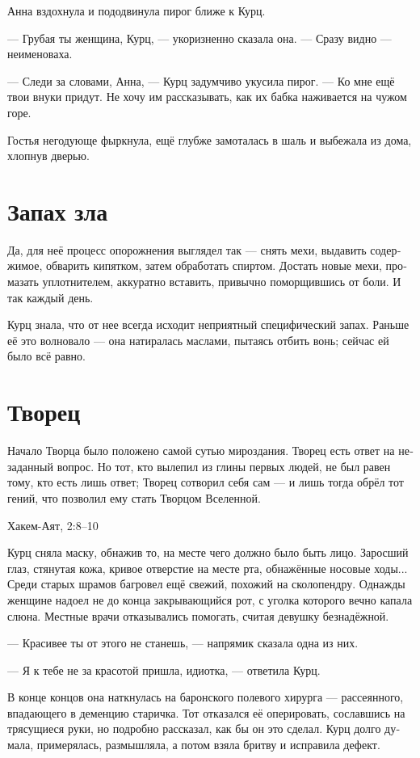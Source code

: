\documentclass[a4paper,12pt,fleqn]{book}\usepackage{cooltooltips}\usepackage{polyglossia}\setdefaultlanguage[babelshorthands=true]{russian}\setotherlanguage{english}\defaultfontfeatures{Ligatures=TeX,Mapping=tex-text} \usepackage{xcolor}\definecolor{lightgray}{HTML}{bbbbbb}\color{lightgray}\newcommand{\ml}[3]{\textenglish{\textcolor{black}{#3}}}
\begin{document}
Анна вздохнула и пододвинула пирог ближе к Курц.

--- Грубая ты женщина, Курц, --- укоризненно сказала она.
--- Сразу видно --- неименоваха.

--- Следи за словами, Анна, --- Курц задумчиво укусила пирог.
--- Ко мне ещё твои внуки придут.
Не хочу им рассказывать, как их бабка наживается на чужом горе.

Гостья негодующе фыркнула, ещё глубже замоталась в шаль и выбежала из дома, хлопнув дверью.

\section{Запах зла}

Да, для неё процесс опорожнения выглядел так --- снять мехи, выдавить содержимое, обварить кипятком, затем обработать спиртом.
Достать новые мехи, промазать уплотнителем, аккуратно вставить, привычно поморщившись от боли.
И так каждый день.

Курц знала, что от нее всегда исходит неприятный специфический запах.
Раньше её это волновало --- она натиралась маслами, пытаясь отбить вонь;
сейчас ей было всё равно.

\section{Творец}

\epigraph{Начало Творца было положено самой сутью мироздания.
Творец есть ответ на незаданный вопрос.
Но тот, кто вылепил из глины первых людей, не был равен тому, кто есть лишь ответ;
Творец сотворил себя сам --- и лишь тогда обрёл тот гений, что позволил ему стать Творцом Вселенной.}
{Хакем-Аят, 2:8--10}

Курц сняла маску, обнажив то, на месте чего должно было быть лицо.
Заросший глаз, стянутая кожа, кривое отверстие на месте рта, обнажённые носовые ходы...
Среди старых шрамов багровел ещё свежий, похожий на сколопендру.
Однажды женщине надоел не до конца закрывающийся рот, с уголка которого вечно капала слюна.
Местные врачи отказывались помогать, считая девушку безнадёжной.

--- Красивее ты от этого не станешь, --- напрямик сказала одна из них.

--- Я к тебе не за красотой пришла, идиотка, --- ответила Курц.

В конце концов она наткнулась на баронского полевого хирурга --- рассеянного, впадающего в деменцию старичка.
Тот отказался её оперировать, сославшись на трясущиеся руки, но подробно рассказал, как бы он это сделал.
Курц долго думала, примерялась, размышляла, а потом взяла бритву и исправила дефект.
\end{document}
